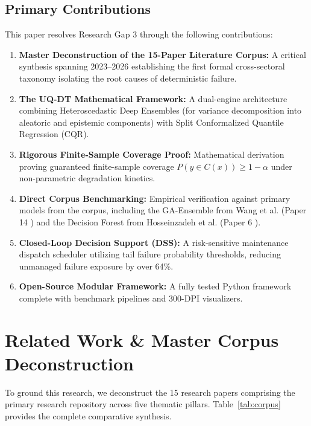 \documentclass[journal,10pt,twocolumn]{article}
\begin{document}
\subsection{Primary Contributions}
This paper resolves Research Gap 3 through the following contributions:
\begin{enumerate}
    \item \textbf{Master Deconstruction of the 15-Paper Literature Corpus:} A critical synthesis spanning 2023--2026 establishing the first formal cross-sectoral taxonomy isolating the root causes of deterministic failure.
    \item \textbf{The UQ-DT Mathematical Framework:} A dual-engine architecture combining Heteroscedastic Deep Ensembles (for variance decomposition into aleatoric and epistemic components) with Split Conformalized Quantile Regression (CQR).
    \item \textbf{Rigorous Finite-Sample Coverage Proof:} Mathematical derivation proving guaranteed finite-sample coverage $P(y \in C(x)) \ge 1 - \alpha$ under non-parametric degradation kinetics.
    \item \textbf{Direct Corpus Benchmarking:} Empirical verification against primary models from the corpus, including the GA-Ensemble from Wang et al. (Paper 14 \cite{wang2026digital}) and the Decision Forest from Hosseinzadeh et al. (Paper 6 \cite{hosseinzadeh2023benchmarking}).
    \item \textbf{Closed-Loop Decision Support (DSS):} A risk-sensitive maintenance dispatch scheduler utilizing tail failure probability thresholds, reducing unmanaged failure exposure by over 64\%.
    \item \textbf{Open-Source Modular Framework:} A fully tested Python framework complete with benchmark pipelines and 300-DPI visualizers.
\end{enumerate}

\section{Related Work \& Master Corpus Deconstruction}

To ground this research, we deconstruct the 15 research papers comprising the primary research repository across five thematic pillars. Table~\ref{tab:corpus} provides the complete comparative synthesis.
\end{document}
